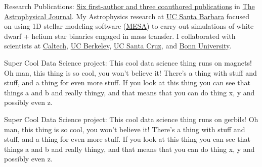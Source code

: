 \documentclass[10pt]{article} %
\begin{document}
\jobb
{Research Publications:}
{\href{http://adsabs.harvard.edu/cgi-bin/nph-abs_connect?library&libname=MyPapers&libid=561872b258}{Six first-author and three coauthored publications} in \href{http://iopscience.iop.org/journal/0004-637X}{The Astrophysical Journal}.}
{My Astrophysics research at \href{http://www.ucsb.edu}{UC Santa Barbara} focused on using 1D stellar modeling software (\href{http://mesa.sourceforge.net/}{MESA}) to carry out simulations of white dwarf + helium star binaries engaged in mass transfer. I collaborated with scientists at \href{https://www.caltech.edu/}{Caltech}, \href{www.berkeley.edu/}{UC Berkeley}, \href{https://www.ucsc.edu}{UC Santa Cruz}, and \href{https://www.uni-bonn.de/}{Bonn University}.}%


\jobb
{Super Cool Data Science project:}
{This cool data science thing runs on magnets!}
{Oh man, this thing is so cool, you won't believe it! There's a thing with stuff and stuff, and a thing for even more stuff. If you look at this thing you can see that things a and b and really thingy, and that means that you can do thing x, y and possibly even z.}



\jobb
{Super Cool Data Science project:}
{This cool data science thing runs on gerbils!}
{Oh man, this thing is so cool, you won't believe it! There's a thing with stuff and stuff, and a thing for even more stuff. If you look at this thing you can see that things a and b and really thingy, and that means that you can do thing x, y and possibly even z.}

\end{document}
